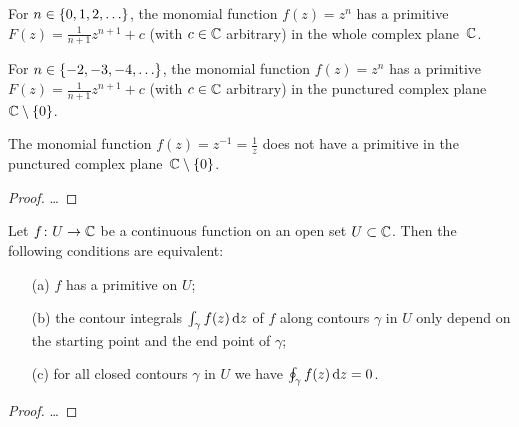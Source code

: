 \begin{lemma}
  \label{lem:monomial_primitive}
  For $n \in \left\{ 0,1,2,\ldots \right\}$, the monomial
  function $f(z) = z^n$ has a primitive
  $F(z) = \frac{1}{n+1} z^{n+1} + c$ (with $c \in \mathbb{C}$ arbitrary)
  in the whole complex plane~$\mathbb{C}$.

  For $n \in \left\{ -2,-3,-4,\ldots \right\}$, the monomial
  function $f(z) = z^n$ has a primitive
  $F(z) = \frac{1}{n+1} z^{n+1} + c$ (with $c \in \mathbb{C}$ arbitrary)
  in the punctured complex plane~$\mathbb{C} \setminus \left\{ 0 \right\}$.

  The monomial function $f(z) = z^{-1} = \frac{1}{z}$ does not have
  a primitive in the punctured complex plane~$\mathbb{C} \setminus \left\{ 0 \right\}$.
\end{lemma}
\begin{proof}
  \ldots
\end{proof}

\begin{theorem}
  \label{thm:primitive_characterization}
  Let $f \colon U \to \mathbb{C}$ be a continuous function on an open
  set $U \subset \mathbb{C}$. Then the following conditions are equivalent:
  \begin{itemize}
    \item[(a)] $f$ has a primitive on $U$;
    \item[(b)] the contour integrals $\int_\gamma f(z) \, \mathrm{d} z$
      of $f$ along contours $\gamma$ in $U$ only depend on the
      starting point and the end point of $\gamma$;
    \item[(c)] for all closed contours $\gamma$ in $U$ we have
      $\oint_\gamma f(z) \, \mathrm{d} z = 0$.
  \end{itemize}
\end{theorem}
\begin{proof}
  \ldots
\end{proof}
